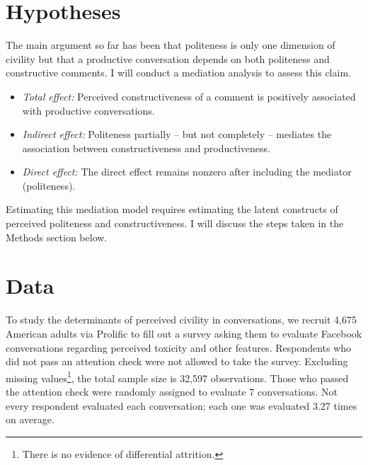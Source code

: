 \documentclass{article}
\begin{document}



\section{Hypotheses}

The main argument so far has been that politeness is only one dimension of civility but that a productive conversation depends on both politeness and constructive comments. I will conduct a mediation analysis to assess this claim. 
\begin{itemize}
    \item \textit{Total effect:} Perceived constructiveness of a comment is positively associated with productive conversations. 
    \item \textit{Indirect effect:} Politeness partially -- but not completely -- mediates the association between constructiveness and productiveness. 
    \item \textit{Direct effect:} The direct effect remains nonzero after including the mediator (politeness). 
\end{itemize}

Estimating this mediation model requires estimating the latent constructs of perceived politeness and constructiveness. I will discuss the steps taken in the Methods section below. 

\section{Data}

To study the determinants of perceived civility in conversations, we recruit 4,675 American adults via Prolific to fill out a survey asking them to evaluate Facebook conversations regarding perceived toxicity and other features. Respondents who did not pass an attention check were not allowed to take the survey. Excluding missing values\footnote{There is no evidence of differential attrition.}, the total sample size is 32,597 observations. Those who passed the attention check were randomly assigned to evaluate 7 conversations. Not every respondent evaluated each conversation; each one was evaluated 3.27 times on average. 
\end{document}
